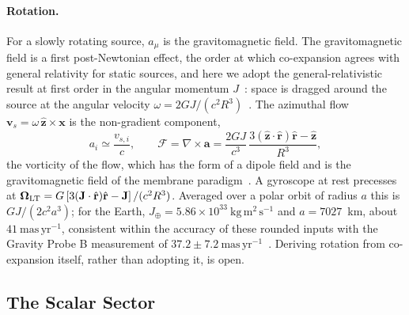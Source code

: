 \documentclass{iopjournal}
\begin{document}
\paragraph{Rotation.} For a slowly rotating source, $a_\mu$ is the gravitomagnetic field. The gravitomagnetic field is a first post-Newtonian effect, the order at which co-expansion agrees with general relativity for static sources, and here we adopt the general-relativistic result at first order in the angular momentum $J$~\cite{Hartle1967}: space is dragged around the source at the angular velocity $\omega=2GJ/(c^2R^3)$~\cite{LenseThirring1918}. The azimuthal flow $\mathbf{v}_s=\omega\,\hat{\mathbf{z}}\times\mathbf{x}$ is the non-gradient component,
\begin{equation}\label{eq_nongradient_flow}
    a_i\simeq\frac{v_{s,i}}{c},
    \qquad
    \mathcal{F}=\nabla\times\mathbf{a}=\frac{2GJ}{c^3}\,\frac{3(\hat{\mathbf{z}}\cdot\hat{\mathbf{r}})\hat{\mathbf{r}}-\hat{\mathbf{z}}}{R^3},
\end{equation}
the vorticity of the flow, which has the form of a dipole field and is the gravitomagnetic field of the membrane paradigm~\cite{ThorneMembrane1986}. A gyroscope at rest precesses at $\boldsymbol{\Omega}_{\rm LT}=G\left[3(\mathbf{J}\cdot\hat{\mathbf{r}})\hat{\mathbf{r}}-\mathbf{J}\right]/(c^2R^3)$. Averaged over a polar orbit of radius $a$ this is $GJ/(2c^2a^3)$; for the Earth, $J_\oplus=5.86\times10^{33}~\mathrm{kg\,m^2\,s^{-1}}$ and $a=7027$~km, about $41~\mathrm{mas\,yr^{-1}}$, consistent within the accuracy of these rounded inputs with the Gravity Probe B measurement of $37.2\pm7.2~\mathrm{mas\,yr^{-1}}$~\cite{Everitt2011GPB}. Deriving rotation from co-expansion itself, rather than adopting it, is open.

\subsection{The Scalar Sector}
\end{document}
